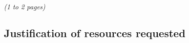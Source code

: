 \documentclass [a4paper, 12pt]{article}
\begin{document}





\textit{(1 to 2 pages)}
\newpage
\subsection{Justification of resources requested}
\end{document}
